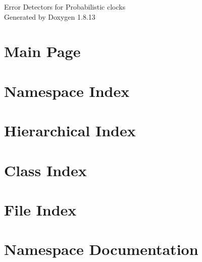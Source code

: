 \documentclass[twoside]{book}
\newcommand{\+}{\discretionary{\mbox{\scriptsize$\hookleftarrow$}}{}{}}
\newcommand{\clearemptydoublepage}{%
  \newpage{\pagestyle{empty}\cleardoublepage}%
}
\begin{document}
\hypersetup{pageanchor=false,
             bookmarksnumbered=true,
             pdfencoding=unicode
            }
\begin{titlepage}
\vspace*{7cm}
\begin{center}%
{\Large Error Detectors for Probabilistic clocks }\\
\vspace*{1cm}
{\large Generated by Doxygen 1.8.13}\\
\end{center}
\end{titlepage}
\clearemptydoublepage
{}
\tableofcontents
\clearemptydoublepage
{}
\hypersetup{pageanchor=true}

\chapter{Main Page}
\label{index}\hypertarget{index}{}
\chapter{Namespace Index}

\chapter{Hierarchical Index}

\chapter{Class Index}

\chapter{File Index}

\chapter{Namespace Documentation}

\end{document}
